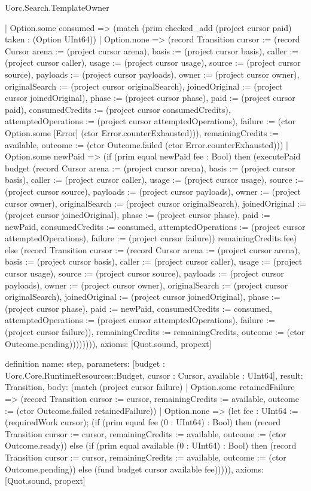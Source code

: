 \begin{lexlean}{Uorc.Search.TemplateOwner}
\begin{semanticmodule}
{        | Option.some consumed => (match (prim checked_add (project cursor paid) taken : (Option UInt64))
          | Option.none => (record Transition {cursor := (record Cursor {arena := (project cursor arena), basis := (project cursor basis), caller := (project cursor caller), usage := (project cursor usage), source := (project cursor source), payloads := (project cursor payloads), owner := (project cursor owner), originalSearch := (project cursor originalSearch), joinedOriginal := (project cursor joinedOriginal), phase := (project cursor phase), paid := (project cursor paid), consumedCredits := (project cursor consumedCredits), attemptedOperations := (project cursor attemptedOperations), failure := (ctor Option.some [Error] (ctor Error.counterExhausted))}), remainingCredits := available, outcome := (ctor Outcome.failed (ctor Error.counterExhausted))})
          | Option.some newPaid => (if (prim equal newPaid fee : Bool) then (executePaid budget (record Cursor {arena := (project cursor arena), basis := (project cursor basis), caller := (project cursor caller), usage := (project cursor usage), source := (project cursor source), payloads := (project cursor payloads), owner := (project cursor owner), originalSearch := (project cursor originalSearch), joinedOriginal := (project cursor joinedOriginal), phase := (project cursor phase), paid := newPaid, consumedCredits := consumed, attemptedOperations := (project cursor attemptedOperations), failure := (project cursor failure)}) remainingCredits fee) else (record Transition {cursor := (record Cursor {arena := (project cursor arena), basis := (project cursor basis), caller := (project cursor caller), usage := (project cursor usage), source := (project cursor source), payloads := (project cursor payloads), owner := (project cursor owner), originalSearch := (project cursor originalSearch), joinedOriginal := (project cursor joinedOriginal), phase := (project cursor phase), paid := newPaid, consumedCredits := consumed, attemptedOperations := (project cursor attemptedOperations), failure := (project cursor failure)}), remainingCredits := remainingCredits, outcome := (ctor Outcome.pending)}))))))),
  axioms: [Quot.sound, propext]
}

definition{
  name: step,
  parameters: [budget : Uorc.Core.RuntimeResources::Budget, cursor : Cursor, available : UInt64],
  result: Transition,
  body: (match (project cursor failure)
    | Option.some retainedFailure => (record Transition {cursor := cursor, remainingCredits := available, outcome := (ctor Outcome.failed retainedFailure)})
    | Option.none => (let fee : UInt64 := (requiredWork cursor); (if (prim equal fee (0 : UInt64) : Bool) then (record Transition {cursor := cursor, remainingCredits := available, outcome := (ctor Outcome.ready)}) else (if (prim equal available (0 : UInt64) : Bool) then (record Transition {cursor := cursor, remainingCredits := available, outcome := (ctor Outcome.pending)}) else (fund budget cursor available fee))))),
  axioms: [Quot.sound, propext]
}


\end{semanticmodule}
\end{lexlean}
